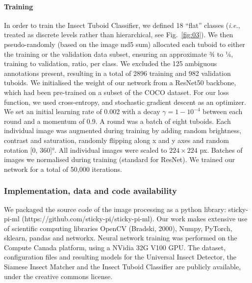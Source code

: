\documentclass[12pt]{article}
\begin{document}
\begin{linenumbers}
		\paragraph{Training}
		In order to train the Insect Tuboid Classifier, we defined 18 “flat” classes (\emph{i.e.}, treated as discrete levels rather than hierarchical, see Fig.~\ref{fig:03}). We then pseudo-randomly (based on the image md5 sum) allocated each tuboid to either the training or the validation data subset, ensuring an approximate ¾ to ¼, training to validation, ratio, per class. We excluded the 125 ambiguous annotations present, resulting in a total of 2896 training and 982 validation tuboids. 
		We initialised the weight of our network from a ResNet50 backbone, which had been pre-trained on a subset of the COCO dataset. For our loss function, we used cross-entropy, and stochastic gradient descent as an optimizer. We set an initial learning rate of 0.002 with a decay $\gamma = 1- 10^{-4}$ between each round and a momentum of 0.9. A round was a batch of eight tuboids. Each individual image was augmented during training by adding random brightness, contrast and saturation, randomly flipping along x and y axes and random rotation [0, 360]°. All individual images were scaled to $224 \times{} 224$ px. Batches of images we normalised during training (standard for ResNet). We trained our network for a total of 50,000 iterations.

		\subsubsection*{Implementation, data and code availability}
		We packaged the source code of the image processing as a python library: sticky-pi-ml (https://github.com/sticky-pi/sticky-pi-ml). Our work makes extensive use of scientific computing libraries OpenCV (Bradski, 2000), Numpy\cite{harris_array_2020}, PyTorch\cite{paszke_pytorch_2019}, sklearn\cite{pedregosa_scikit-learn_2011}, pandas\cite{the_pandas_development_team_pandas-devpandas_2020} and networkx\cite{hagberg_exploring_2008}. Neural network training was performed on the Compute Canada platform, using a NVidia 32G V100 GPU. The dataset, configuration files and resulting models for the Universal Insect Detector, the Siamese Insect Matcher and the Insect Tuboid Classifier are publicly available, under the creative commons license\cite{geissmann_sticky_2021}. 


\end{linenumbers}
\end{document}
